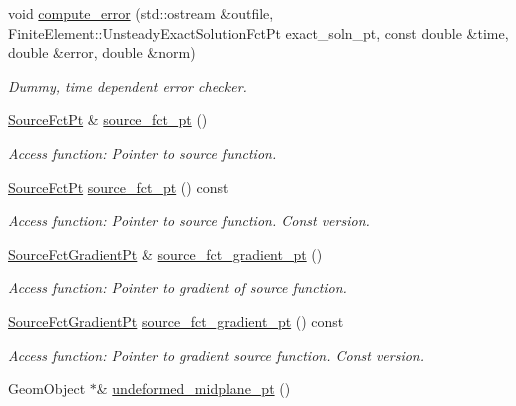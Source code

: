 \begin{DoxyCompactItemize}
void \hyperlink{classoomph_1_1MyShellEquations_a6a62a37fa44a5001c167071f9bf80c2f}{compute\+\_\+error} (std\+::ostream \&outfile, Finite\+Element\+::\+Unsteady\+Exact\+Solution\+Fct\+Pt exact\+\_\+soln\+\_\+pt, const double \&time, double \&error, double \&norm)
\begin{DoxyCompactList}\small\item\em Dummy, time dependent error checker. \end{DoxyCompactList}\item 
\hyperlink{classoomph_1_1MyShellEquations_a056d2488b6e65787f5c9935a321b7a9b}{Source\+Fct\+Pt} \& \hyperlink{classoomph_1_1MyShellEquations_a8aee1d7092584b9ad7095dfd905f5893}{source\+\_\+fct\+\_\+pt} ()
\begin{DoxyCompactList}\small\item\em Access function\+: Pointer to source function. \end{DoxyCompactList}\item 
\hyperlink{classoomph_1_1MyShellEquations_a056d2488b6e65787f5c9935a321b7a9b}{Source\+Fct\+Pt} \hyperlink{classoomph_1_1MyShellEquations_a3cf0287a7fcc34f88c011805ae18fdcb}{source\+\_\+fct\+\_\+pt} () const
\begin{DoxyCompactList}\small\item\em Access function\+: Pointer to source function. Const version. \end{DoxyCompactList}\item 
\hyperlink{classoomph_1_1MyShellEquations_a954dcc1b78710f331ed390b716aa07dd}{Source\+Fct\+Gradient\+Pt} \& \hyperlink{classoomph_1_1MyShellEquations_a1ade98830b556492e11aef07cf34d3ed}{source\+\_\+fct\+\_\+gradient\+\_\+pt} ()
\begin{DoxyCompactList}\small\item\em Access function\+: Pointer to gradient of source function. \end{DoxyCompactList}\item 
\hyperlink{classoomph_1_1MyShellEquations_a954dcc1b78710f331ed390b716aa07dd}{Source\+Fct\+Gradient\+Pt} \hyperlink{classoomph_1_1MyShellEquations_aeb57d576c45c382206c6af6b8b06b575}{source\+\_\+fct\+\_\+gradient\+\_\+pt} () const
\begin{DoxyCompactList}\small\item\em Access function\+: Pointer to gradient source function. Const version. \end{DoxyCompactList}\item 
Geom\+Object $\ast$\& \hyperlink{classoomph_1_1MyShellEquations_acf40f3e2413d4640be3ba3664b8d0426}{undeformed\+\_\+midplane\+\_\+pt} ()

\end{DoxyCompactItemize}
